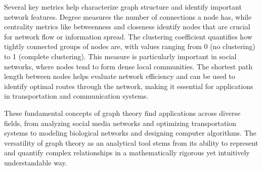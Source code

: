 \begin{figure}
\begin{tcolorbox}[every float=\centering, drop shadow, title=Concepts of Graph Theory ,colback=white,colframe=WMgreen,
  colbacktitle=WMgreen,]
  \label{fig:BasicGraphs}
 \end{tcolorbox}
 \end{figure}
 \FloatBarrier %
 
Several key metrics help characterize graph structure and identify important network features. \gls{Degree} measures the number of connections a node has, while \gls{centrality} metrics like betweenness and closeness identify nodes that are crucial for network flow or information spread. The \gls{clustering coefficient} quantifies how tightly connected groups of nodes are, with values ranging from 0 (no clustering) to 1 (complete clustering). This measure is particularly important in social networks, where nodes tend to form dense local communities. The shortest path length between nodes helps evaluate network efficiency and can be used to identify optimal routes through the network, making it essential for applications in transportation and communication systems.

These fundamental concepts of graph theory find applications across diverse fields, from analyzing social media networks and optimizing transportation systems to modeling biological networks and designing computer algorithms. The versatility of graph theory as an analytical tool stems from its ability to represent and quantify complex relationships in a mathematically rigorous yet intuitively understandable way.

